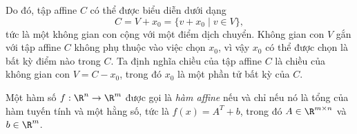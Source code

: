 Do đó, tập affine $C$ có thể được biểu diễn dưới dạng
\begin{equation}
    C = V + x_0 = \{v + x_0 \mid v \in V\},
\end{equation}
tức là một không gian con cộng với một điểm dịch chuyển. Không gian con $V$ gắn với tập affine $C$ không phụ thuộc vào việc chọn $x_0$, vì vậy $x_0$ có thể được chọn là bất kỳ điểm nào trong $C$. Ta định nghĩa chiều của tập affine $C$ là chiều của không gian con $V = C - x_0$, trong đó $x_0$ là một phần tử bất kỳ của $C$.

\begin{define}
    \label{define:affine_func}
    Một hàm số  $f: \R^n \to \R^m$ được gọi là \textit{hàm affine} nếu và chỉ nếu nó là tổng của hàm tuyến tính và một hằng số, tức là \(f(x)=A^T+b\), trong đó \(A\in \R^{m\times n}\) và \(b\in \R^m\).
\end{define}